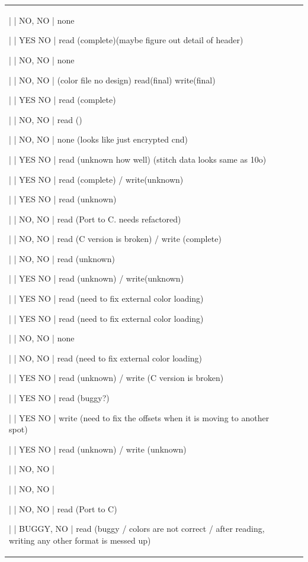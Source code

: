 \begin{tabular}{l l l}
| \index{\texttt{art}}
| NO, NO
| none

| \index{\texttt{bro}}
| YES NO
| read (complete)(maybe figure out detail of header)

| \index{\texttt{cnd}}
| NO, NO
| none

| \index{\texttt{col}}
| NO, NO
| (color file no design) read(final) write(final)

| \index{\texttt{csd}}
| YES NO
| read (complete)

| \index{\texttt{dat}}
| NO, NO
| read ()

| \index{\texttt{dem}}
| NO, NO
| none (looks like just encrypted cnd)

| \index{\texttt{dsb}}
| YES NO
| read (unknown how well) (stitch data looks same as 10o)

| \index{\texttt{dst}}
| YES NO
| read (complete) / write(unknown)

| \index{\texttt{dsz}}
| YES NO
| read (unknown)

| \index{\texttt{dxf}}
| NO, NO
| read (Port to C. needs refactored)

| \index{\texttt{edr}}
| NO, NO
| read (C version is broken) / write (complete)

| \index{\texttt{emd}}
| NO, NO
| read (unknown)

| \index{\texttt{exp}}
| YES NO
| read (unknown) / write(unknown)

| \index{\texttt{exy}}
| YES NO
| read (need to fix external color loading)

| \index{\texttt{fxy}}
| YES NO
| read (need to fix external color loading)

| \index{\texttt{gnc}}
| NO, NO
| none

| \index{\texttt{gt}}
| NO, NO
| read (need to fix external color loading)

| \index{\texttt{hus}}
| YES NO
| read (unknown) / write (C version is broken)

| \index{\texttt{inb}}
| YES NO
| read (buggy?)

| \index{\texttt{jef}}
| YES NO
| write (need to fix the offsets when it is moving to another spot)

| \index{\texttt{ksm}}
| YES NO
| read (unknown) / write (unknown)

| \index{\texttt{pcd}}
| NO, NO
|

| \index{\texttt{pcm}}
| NO, NO
|

| \index{\texttt{pcq}}
| NO, NO
| read (Port to C)

| \index{\texttt{pcs}}
| BUGGY, NO
| read (buggy / colors are not correct / after reading, writing any other format is messed up)


\end{tabular}
